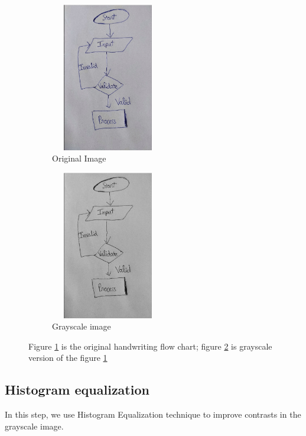 \begin{figure}[h]
\centering
    \begin{subfigure}{0.4\textwidth}
        \centering
        \includegraphics[width=5cm, height=6.5cm]{Images/Preprocessing/rawImage.png}
        \caption{Original Image}
        \label{fig:rawImage}
    \end{subfigure}
    \begin{subfigure}{0.4\textwidth}
        \centering
        \includegraphics[width=5cm, height=6.5cm]{Images/Preprocessing/grayscale.png}
        \caption{Grayscale image}
        \label{fig:grayscaleImage}
    \end{subfigure}
    \caption{Figure \ref{fig:rawImage} is the original handwriting flow chart; figure \ref{fig:grayscaleImage} is grayscale version of the figure \ref{fig:rawImage}} 
    \label{fig:grayscale_step}
\end{figure}

\subsection{Histogram equalization}
\hspace{0.5cm} {In this step, we use Histogram Equalization technique to improve contrasts in the grayscale image.}

